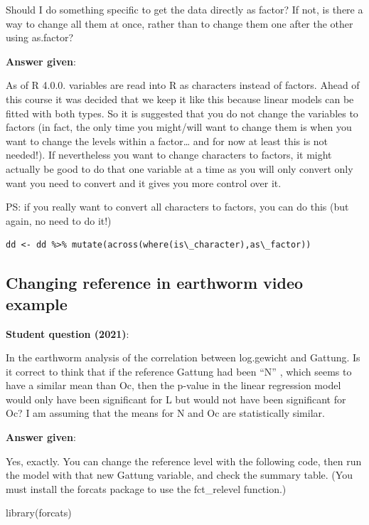 \documentclass[
  letterpaper,
  8pt,
  a4paper]{book}
\begin{document}
Should I do something specific to get the data directly as factor? If
not, is there a way to change all them at once, rather than to change
them one after the other using as.factor?

\textbf{Answer given}:

As of R 4.0.0. variables are read into R as characters instead of
factors. Ahead of this course it was decided that we keep it like this
because linear models can be fitted with both types. So it is suggested
that you do not change the variables to factors (in fact, the only time
you might/will want to change them is when you want to change the levels
within a factor\ldots{} and for now at least this is not needed!). If
nevertheless you want to change characters to factors, it might actually
be good to do that one variable at a time as you will only convert only
want you need to convert and it gives you more control over it.

PS: if you really want to convert all characters to factors, you can do
this (but again, no need to do it!)

\begin{verbatim}
dd <- dd %>% mutate(across(where(is\_character),as\_factor)) 
\end{verbatim}

\subsection*{Changing reference in earthworm video
example}\label{changing-reference-in-earthworm-video-example}

\textbf{Student question (2021)}:

In the earthworm analysis of the correlation between log.gewicht and
Gattung. Is it correct to think that if the reference Gattung had been
``N'' , which seems to have a similar mean than Oc, then the p-value in
the linear regression model would only have been significant for L but
would not have been significant for Oc? I am assuming that the means for
N and Oc are statistically similar.

\textbf{Answer given}:

Yes, exactly. You can change the reference level with the following
code, then run the model with that new Gattung variable, and check the
summary table. (You must install the forcats package to use the
fct\_relevel function.)

library(forcats)
\end{document}
